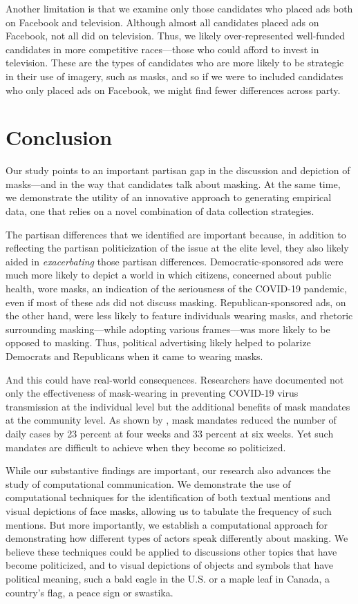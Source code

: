Another limitation is that we examine only those candidates who placed ads both on Facebook and television.  Although almost all candidates placed ads on Facebook, not all did on television.  Thus, we likely over-represented well-funded candidates in more competitive races---those who could afford to invest in television.  These are the types of candidates who are more likely to be strategic in their use of imagery, such as masks, and so if we were to included candidates who only placed ads on Facebook, we might find fewer differences across party.

\section*{Conclusion}

Our study points to an important partisan gap in the discussion and depiction of masks---and in the way that candidates talk about masking. At the same time, we demonstrate the utility of an innovative approach to generating empirical data, one that relies on a novel combination of data collection strategies.

The partisan differences that we identified are important because, in addition to reflecting the partisan politicization of the issue at the elite level, they also likely aided in \emph{exacerbating} those partisan differences. Democratic-sponsored ads were much more likely to depict a world in which citizens, concerned about public health, wore masks, an indication of the seriousness of the COVID-19 pandemic, even if most of these ads did not discuss masking. Republican-sponsored ads, on the other hand, were less likely to feature individuals wearing masks, and rhetoric surrounding masking---while adopting various frames---was more likely to be opposed to masking.  Thus, political advertising likely helped to polarize Democrats and Republicans when it came to wearing masks.

And this could have real-world consequences. Researchers have documented not only the effectiveness of mask-wearing in preventing COVID-19 virus transmission at the individual level but the additional benefits of mask mandates at the community level. As shown by \cite{huang_effectiveness_2022}, mask mandates reduced the number of daily cases by 23 percent at four weeks and 33 percent at six weeks. Yet such mandates are difficult to achieve when they become so politicized.

While our substantive findings are important, our research also advances the study of computational communication. We demonstrate the use of computational techniques for the identification of both textual mentions and visual depictions of face masks, allowing us to tabulate the frequency of such mentions.  But more importantly, we establish a computational approach for demonstrating how different types of actors speak differently about masking.  We believe these techniques could be applied to discussions other topics that have become politicized, and to visual depictions of objects and symbols that have political meaning, such a bald eagle in the U.S. or a maple leaf in Canada, a country's flag, a peace sign or swastika.


